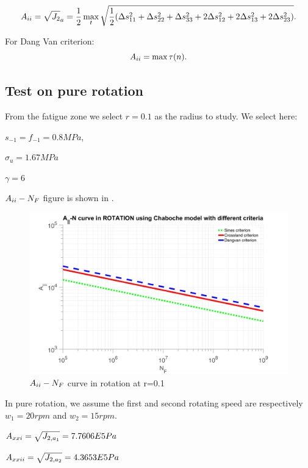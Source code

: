 $$A_{\uppercase\expandafter{\romannumeral2}}=\sqrt{J_2}_a=\frac{1}{2}\max\limits_{t}\sqrt{\frac{1}{2}(\Delta s_{11}^2+\Delta s_{22}^2+\Delta s_{33}^2+2\Delta s_{12}^2+2\Delta s_{13}^2+2\Delta s_{23}^2)}.$$

For Dang Van criterion:
$$A_{\uppercase\expandafter{\romannumeral2}}= \max\tau(n).$$ 

\newpage
\subsection{Test on pure rotation}

From the fatigue zone we select $r=0.1$ as the radius to study. We select here:

$s_{-1}=f_{-1}=0.8MPa$,

$\sigma_{u}=1.67MPa$ 

$\gamma=6$


$A_{\uppercase\expandafter{\romannumeral2}}-N_F$ figure is shown in . 
\begin{figure}[h!]
	\centering
	\includegraphics[width=\textwidth]{figures//JNrotation.png} 
	\caption{$A_{\uppercase\expandafter{\romannumeral2}}-N_F$ curve in rotation at r=0.1}
	\label{JNrotation}
\end{figure}

In pure rotation, we assume the first and second rotating speed are respectively $w_1=20rpm$ and $w_2=15rpm$.  

\vspace{6pt}
$A_{\uppercase\expandafter{\romannumeral2}1}=\sqrt{J_{2,a_1}}=7.7606E5 Pa$

\vspace{6pt}
$A_{\uppercase\expandafter{\romannumeral2}2}=\sqrt{J_{2,a_2}}=4.3653E5 Pa$

